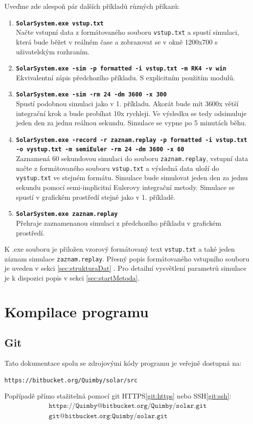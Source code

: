 Uveďme zde alespoň pár dalších příkladů různých příkazů:
\begin{enumerate}
	\item \texttt{\textbf{SolarSystem.exe vstup.txt}} \\
	Načte vstupní data z formátovaného souboru \texttt{vstup.txt} a spustí simulaci, která bude běžet v reálném čase a zobrazovat se v okně 1200x700 s uživatelským rozhraním.
	\item \texttt{\textbf{SolarSystem.exe -sim -p formatted -i vstup.txt -m RK4 -v win}} \\
	 Ekvivalentní zápis předchozího příkladu. S explicitním použitím modulů.
	\item \texttt{\textbf{SolarSystem.exe -sim -rm 24 -dm 3600 -x 300}} \\
	Spustí podobnou simulaci jako v 1. příkladu. Akorát bude mít 3600x větší integrační krok a bude probíhat 10x rychleji. Ve výsledku se tedy odsimuluje jeden den za jednu reálnou sekundu. Simulace se vypne po 5 minutách běhu.
	\item \texttt{\textbf{SolarSystem.exe -record -r zaznam.replay -p formatted -i vstup.txt -o vystup.txt -m semiEuler -rm 24 -dm 3600 -x 60}}\\
	Zaznamená 60 sekundovou simulaci do souboru \texttt{zaznam.replay}, vstupní data načte z formátovaného souboru \texttt{vstup.txt} a výsledná data uloží do \texttt{vystup.txt} ve stejném formátu. Simulace bude simulovat jeden den za jednu sekundu pomocí semi-implicitní Eulerovy integrační metody. Simulace se spustí v grafickém prostředí stejně jako v 1. příkladě.
	\item  \texttt{\textbf{SolarSystem.exe zaznam.replay}}\\
	Přehraje zaznamenanou simulaci z předchozího příkladu v grafickém prostředí.
\end{enumerate}
K .exe souboru je přiložen vzorový formátovaný text \texttt{vstup.txt} a také jeden záznam simulace \texttt{zaznam.replay}.
Přesný popis formátovaného vstupního souboru je uveden v sekci \ref{sec:strukturaDat} . Pro detailní vysvětlení parametrů simulace je k dispozici popis v sekci \ref{sec:startMetoda}.


\chapter{Kompilace programu}
\section{Git}
Tato dokumentace spolu se zdrojovými kódy programu je veřejně dostupná na:
\begin{center}
\texttt{https://bitbucket.org/Quimby/solar/src}
\end{center}
Popřípadě přímo stažitelná pomocí git HTTPS\eqref{git:https} nebo SSH\eqref{git:ssh}:
\begin{align}
	\label{git:https}
	\texttt{https://Quimby@bitbucket.org/Quimby/solar.git}\\
	\label{git:ssh}
	\texttt{git@bitbucket.org:Quimby/solar.git}
\end{align}
